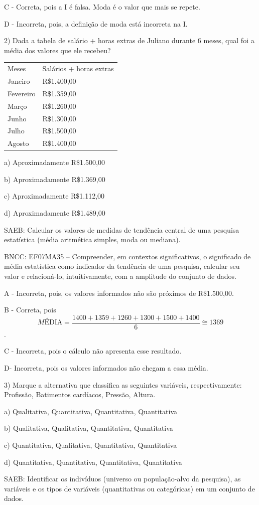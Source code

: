 C - Correta, pois a I é falsa. Moda é o valor que mais se repete.

D - Incorreta, pois, a definição de moda está incorreta na I.

2) Dada a tabela de salário + horas extras de Juliano durante 6 meses,
qual foi a média dos valores que ele recebeu?

\begin{longtable}[]{@{}ll@{}}
\toprule
\endhead
Meses & Salários + horas extras\tabularnewline
Janeiro & R\$1.400,00\tabularnewline
Fevereiro & R\$1.359,00\tabularnewline
Março & R\$1.260,00\tabularnewline
Junho & R\$1.300,00\tabularnewline
Julho & R\$1.500,00\tabularnewline
Agosto & R\$1.400,00\tabularnewline
\bottomrule
\end{longtable}

a) Aproximadamente R\$1.500,00

b) Aproximadamente R\$1.369,00

c) Aproximadamente R\$1.112,00

d) Aproximadamente R\$1.489,00

SAEB: Calcular os valores de medidas de tendência central de uma
pesquisa estatística (média aritmética simples, moda ou mediana).

BNCC: EF07MA35 -- Compreender, em contextos significativos, o
significado de média estatística como indicador da tendência de uma
pesquisa, calcular seu valor e relacioná-lo, intuitivamente, com a
amplitude do conjunto de dados.

A - Incorreta, pois, os valores informados não são próximos de
R\$1.500,00.

B - Correta, pois
\[MÉ\text{DIA} = \frac{1400 + 1359 + 1260 + 1300 + 1500 + 1400}{6} \cong 1369\].

C - Incorreta, pois o cálculo não apresenta esse resultado.

D- Incorreta, pois os valores informados não chegam a essa média.

3) Marque a alternativa que classifica as seguintes variáveis,
respectivamente: Profissão, Batimentos cardíacos, Pressão, Altura.

a) Qualitativa, Quantitativa, Quantitativa, Quantitativa

b) Qualitativa, Qualitativa, Quantitativa, Quantitativa

c) Quantitativa, Qualitativa, Quantitativa, Quantitativa

d) Quantitativa, Quantitativa, Quantitativa, Quantitativa

SAEB: Identificar os indivíduos (universo ou população-alvo da
pesquisa), as variáveis e os tipos de variáveis (quantitativas ou
categóricas) em um conjunto de dados.

